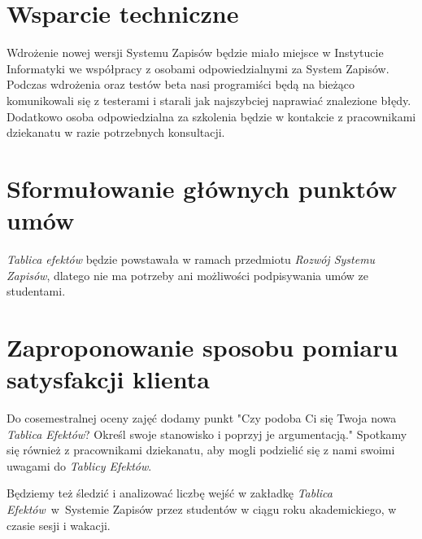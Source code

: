 \documentclass{article}
\newcommand{\TaE}{\textit{Tablica Efektów}}
\newcommand{\TyE}{\textit{Tablicy Efektów}}
\begin{document}
\section{Wsparcie techniczne}
Wdrożenie nowej wersji Systemu Zapisów będzie miało miejsce w Instytucie Informatyki we współpracy z osobami odpowiedzialnymi za System Zapisów.
Podczas wdrożenia oraz testów beta nasi programiści będą na bieżąco komunikowali się z testerami i starali jak najszybciej naprawiać znalezione błędy.
Dodatkowo osoba odpowiedzialna za szkolenia będzie w kontakcie z pracownikami dziekanatu w razie potrzebnych konsultacji.

\section{Sformułowanie głównych punktów umów}
\textit{Tablica efektów} będzie powstawała w ramach przedmiotu \textit{Rozwój Systemu Zapisów}, dlatego nie ma potrzeby ani możliwości podpisywania umów ze studentami.

\section{Zaproponowanie sposobu pomiaru satysfakcji klienta}
Do cosemestralnej oceny zajęć dodamy punkt "Czy podoba Ci się Twoja nowa \TaE? Określ swoje stanowisko i poprzyj je argumentacją." Spotkamy się również z pracownikami dziekanatu, 
aby mogli podzielić się z nami swoimi uwagami do \TyE. 

Będziemy też śledzić i analizować liczbę wejść w zakładkę \TaE\ w~Systemie Zapisów przez studentów w ciągu roku akademickiego, w czasie sesji i wakacji.
\end{document}
